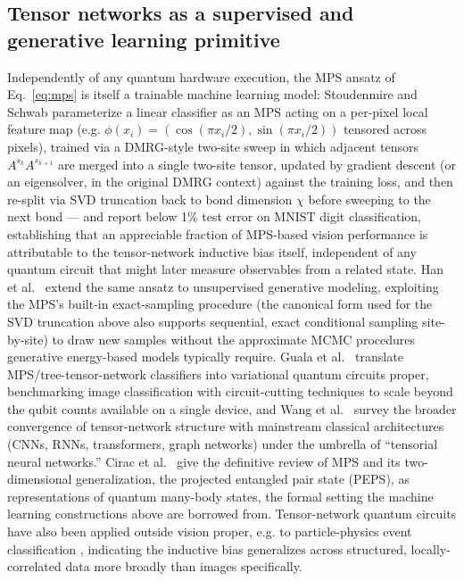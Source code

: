 \documentclass[11pt]{article}
\begin{document}
\subsection{Tensor networks as a supervised and generative learning primitive}
Independently of any quantum hardware execution, the MPS ansatz of Eq.~\eqref{eq:mps} is itself a trainable machine learning model: Stoudenmire and Schwab \cite{Stoudenmire2016} parameterize a linear classifier as an MPS acting on a per-pixel local feature map (e.g. $\phi(x_i)=(\cos(\pi x_i/2),\sin(\pi x_i/2))$ tensored across pixels), trained via a DMRG-style two-site sweep in which adjacent tensors $A^{s_k}A^{s_{k+1}}$ are merged into a single two-site tensor, updated by gradient descent (or an eigensolver, in the original DMRG context) against the training loss, and then re-split via SVD truncation back to bond dimension $\chi$ before sweeping to the next bond — and report below 1\% test error on MNIST digit classification, establishing that an appreciable fraction of MPS-based vision performance is attributable to the tensor-network inductive bias itself, independent of any quantum circuit that might later measure observables from a related state. Han et al.\ \cite{Han2018} extend the same ansatz to unsupervised generative modeling, exploiting the MPS's built-in exact-sampling procedure (the canonical form used for the SVD truncation above also supports sequential, exact conditional sampling site-by-site) to draw new samples without the approximate MCMC procedures generative energy-based models typically require. Guala et al.\ \cite{Guala2023} translate MPS/tree-tensor-network classifiers into variational quantum circuits proper, benchmarking image classification with circuit-cutting techniques to scale beyond the qubit counts available on a single device, and Wang et al.\ \cite{Wang2023TN} survey the broader convergence of tensor-network structure with mainstream classical architectures (CNNs, RNNs, transformers, graph networks) under the umbrella of ``tensorial neural networks.'' Cirac et al.\ \cite{Cirac2021} give the definitive review of MPS and its two-dimensional generalization, the projected entangled pair state (PEPS), as representations of quantum many-body states, the formal setting the machine learning constructions above are borrowed from. Tensor-network quantum circuits have also been applied outside vision proper, e.g. to particle-physics event classification \cite{Araz2022}, indicating the inductive bias generalizes across structured, locally-correlated data more broadly than images specifically.
\end{document}
